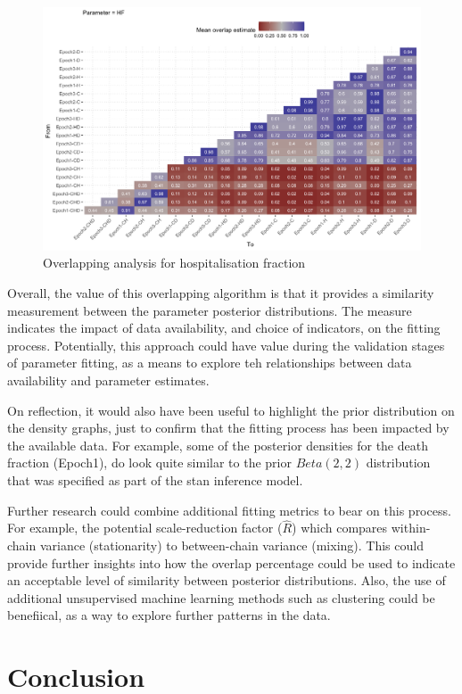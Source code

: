 \documentclass[10pt,letterpaper]{article}
\begin{document}
\begin{figure}
\includegraphics[width=0.85\linewidth]{diagrams/exp_overlap_HF} \caption{Overlapping analysis for hospitalisation fraction}\label{fig:exp-overlap-hf}
\end{figure}

Overall, the value of this overlapping algorithm is that it provides a similarity measurement between the parameter posterior distributions. The measure indicates the impact of data availability, and choice of indicators, on the fitting process. Potentially, this approach could have value during the validation stages of parameter fitting, as a means to explore teh relationships between data availability and parameter estimates.

On reflection, it would also have been useful to highlight the prior distribution on the density graphs, just to confirm that the fitting process has been impacted by the available data. For example, some of the posterior densities for the death fraction (Epoch1), do look quite similar to the prior \(Beta(2,2)\) distribution that was specified as part of the stan inference model.

Further research could combine additional fitting metrics to bear on this process. For example, the potential scale-reduction factor (\(\widehat{R}\)) \citep{https://doi.org/10.1002/sdr.1693} which compares within-chain variance (stationarity) to between-chain variance (mixing). This could provide further insights into how the overlap percentage could be used to indicate an acceptable level of similarity between posterior distributions. Also, the use of additional unsupervised machine learning methods such as clustering could be benefiical, as a way to explore further patterns in the data.

\hypertarget{conclusion}{%
\section{Conclusion}\label{conclusion}}
\end{document}
